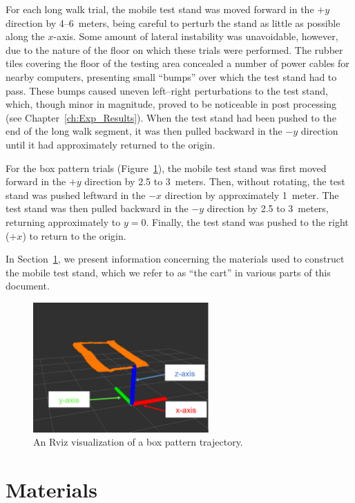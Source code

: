 For each long walk trial, the mobile test stand was moved forward in the $+y$ direction by 4--6~meters, being careful to perturb the stand as little as possible along the $x$-axis. Some amount of lateral instability was unavoidable, however, due to the nature of the floor on which these trials were performed. The rubber tiles covering the floor of the testing area concealed a number of power cables for nearby computers, presenting small ``bumps'' over which the test stand had to pass. These bumps caused uneven left--right perturbations to the test stand, which, though minor in magnitude, proved to be noticeable in post processing (see Chapter~\ref{ch:Exp_Results}). When the test stand had been pushed to the end of the long walk segment, it was then pulled backward in the $-y$ direction until it had approximately returned to the origin.

For the box pattern trials (Figure~\ref{fig:good_box}), the mobile test stand was first moved forward in the $+y$ direction by 2.5 to 3~meters. Then, without rotating, the test stand was pushed leftward in the $-x$ direction by approximately 1~meter. The test stand was then pulled backward in the $-y$ direction by 2.5 to 3~meters, returning approximately to $y = 0$. Finally, the test stand was pushed to the right ($+x$) to return to the origin.

In Section~\ref{sec:materials}, we present information concerning the materials used to construct the mobile test stand, which we refer to as ``the cart'' in various parts of this document.

\begin{figure}[H]
  \centering
    \includegraphics[width=0.6\textwidth]{good_box_5_cropped}
  \caption[Rviz Visualization of a Box Pattern Trajectory]{An Rviz visualization of a box pattern trajectory.}
  \label{fig:good_box}
\end{figure}

\pagebreak
\section{Materials} \label{sec:materials}
